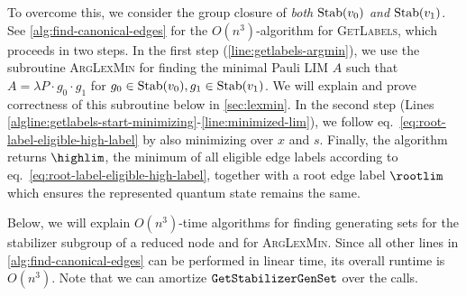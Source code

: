 To overcome this, we consider the group closure of \emph{both} $\text{Stab}(v_0)$ \emph{and} $\text{Stab}(v_1)$.
See \autoref{alg:find-canonical-edges} for the $O(n^3)$-algorithm for \textsc{GetLabels}, which proceeds in two steps.
In the first step (\autoref{line:getlabels-argmin}), we use the subroutine \textsc{ArgLexMin} for finding the minimal Pauli LIM $A$ such that $A = \lambda P \cdot g_0 \cdot g_1$ for $g_0\in \text{Stab}(v_0), g_1\in \text{Stab}(v_1)$.
We will explain and prove correctness of this subroutine below in \autoref{sec:lexmin}.
In the second step (Lines \ref{algline:getlabels-start-minimizing}-\ref{line:minimized-lim}), we follow eq.~\eqref{eq:root-label-eligible-high-label} by also minimizing over $x$ and $s$.
Finally, the algorithm returns $\highlim$, the minimum of all eligible edge labels according to eq.~\eqref{eq:root-label-eligible-high-label}, together with a root edge label $\rootlim$ which ensures the represented quantum state remains the same.

Below, we will explain $O(n^3)$-time algorithms for finding generating sets for the stabilizer subgroup of a reduced node and for \textsc{ArgLexMin}.
Since all other lines in \autoref{alg:find-canonical-edges} can be performed in linear time, its overall runtime is $O(n^3)$.
Note that we can amortize ${\tt GetStabilizerGenSet}$ over the \makeedge calls.
















